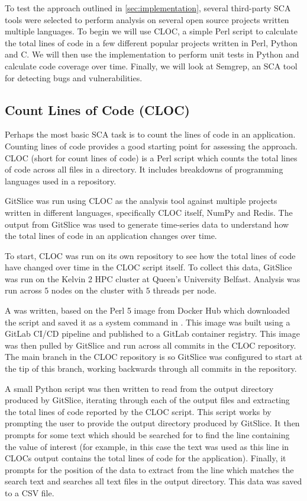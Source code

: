 To test the approach outlined in \autoref{sec:implementation}, several third-party SCA tools were selected to perform analysis on several open source projects written multiple languages.
To begin we will use CLOC, a simple Perl script to calculate the total lines of code in a few different popular projects written in Perl, Python and C\@.
We will then use the implementation to perform unit tests in Python and calculate code coverage over time.
Finally, we will look at Semgrep, an SCA tool for detecting bugs and vulnerabilities.

\subsection{Count Lines of Code (CLOC)}
\label{subsec:counting-lines-of-code}

Perhaps the most basic SCA task is to count the lines of code in an application.
Counting lines of code provides a good starting point for assessing the approach.
CLOC (short for count lines of code) is a Perl script which counts the total lines of code across all files in a directory.
It includes breakdowns of programming languages used in a repository.

GitSlice was run using CLOC as the analysis tool against multiple projects written in different languages, specifically CLOC itself, NumPy and Redis.
The output from GitSlice was used to generate time-series data to understand how the total lines of code in an application changes over time.

To start, CLOC was run on its own repository to see how the total lines of code have changed over time in the CLOC script itself.
To collect this data, GitSlice was run on the Kelvin 2 HPC cluster at Queen's University Belfast.
Analysis was run across $ 5 $ nodes on the cluster with $ 5 $ threads per node.

A  was written, based on the Perl 5 image from Docker Hub which downloaded the script and saved it as a system command in .
This image was built using a GitLab CI/CD pipeline and published to a GitLab container registry.
This image was then pulled by GitSlice and run across all commits in the CLOC repository.
The main branch in the CLOC repository is  so GitSlice was configured to start at the tip of this branch, working backwards through all commits in the repository.

A small Python script was then written to read from the output directory produced by GitSlice, iterating through each of the output files and extracting the total lines of code reported by the CLOC script.
This script works by prompting the user to provide the output directory produced by GitSlice.
It then prompts for some text which should be searched for to find the line containing the value of interest (for example, in this case the text  was used as this line in CLOCs output contains the total lines of code for the application).
Finally, it prompts for the position of the data to extract from the line which matches the search text and searches all text files in the output directory.
This data was saved to a CSV file.

